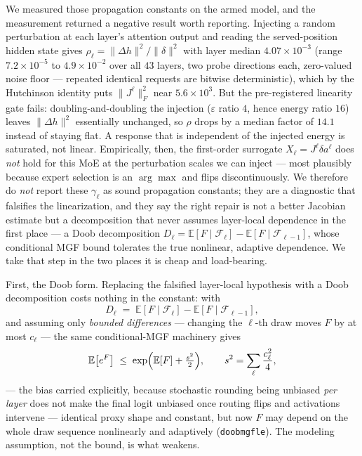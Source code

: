 \documentclass[11pt]{article}
\renewcommand{\_}{\WCorigunderscore\allowbreak}
\begin{document}
We measured those propagation constants on the armed model, and the
measurement returned a negative result worth reporting. Injecting a
random perturbation at each layer's attention output and reading the
served-position hidden state gives $\rho_\ell=\|\Delta
h\|^2/\|\delta\|^2$ with layer median $4.07\times10^{-3}$ (range
$7.2\times10^{-5}$ to $4.9\times10^{-2}$ over all $43$ layers, two probe
directions each, zero-valued noise floor --- repeated identical requests
are bitwise deterministic), which by the Hutchinson identity puts
$\|J^\ell\|_F^2$ near $5.6\times10^3$. But the pre-registered linearity
gate fails: doubling-and-doubling the injection ($\varepsilon$ ratio
$4$, hence energy ratio $16$) leaves $\|\Delta h\|^2$ essentially
unchanged, so $\rho$ drops by a median factor of $14.1$ instead of
staying flat. A response that is independent of the injected energy is
saturated, not linear. Empirically, then, the first-order surrogate
$X_\ell=J^\ell\delta a^\ell$ does \emph{not} hold for this MoE at the
perturbation scales we can inject --- most plausibly because expert
selection is an $\arg\max$ and flips discontinuously. We therefore do
\emph{not} report these $\gamma_\ell$ as sound propagation constants;
they are a diagnostic that falsifies the linearization, and they say the
right repair is not a better Jacobian estimate but a decomposition that
never assumes layer-local dependence in the first place --- a Doob
decomposition $D_\ell=\mathbb{E}[F\mid\mathcal{F}_\ell]-\mathbb{E}
[F\mid\mathcal{F}_{\ell-1}]$, whose conditional MGF bound tolerates the
true nonlinear, adaptive dependence. We take that step in the two
places it is cheap and load-bearing.

First, the Doob form. Replacing the falsified layer-local hypothesis
with a Doob decomposition costs nothing in the constant: with
\begin{equation}
D_\ell\;=\;\mathbb{E}[F\mid\mathcal{F}_\ell]
          -\mathbb{E}[F\mid\mathcal{F}_{\ell-1}] ,
\label{eq:doob}
\end{equation}
and assuming only \emph{bounded differences} --- changing the $\ell$-th
draw moves $F$ by at most $c_\ell$ --- the same conditional-MGF
machinery gives
\begin{equation}
\mathbb{E}\bigl[e^{F}\bigr]\;\le\;
\exp\Bigl(\mathbb{E}[F]+\tfrac{s^2}{2}\Bigr),
\qquad
s^2=\sum_\ell \frac{c_\ell^{2}}{4} ,
\label{eq:doobmgf}
\end{equation}
--- the bias carried explicitly, because
stochastic rounding being unbiased \emph{per layer} does not make the
final logit unbiased once routing flips and activations intervene ---
identical proxy shape and constant, but now $F$ may depend on the whole
draw sequence nonlinearly and adaptively (\texttt{doob\_mgf\_le}). The
modeling assumption, not the bound, is what weakens.
\end{document}
